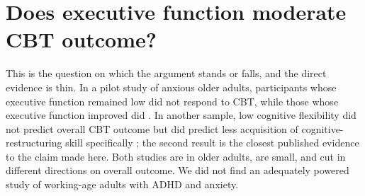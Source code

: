 \section{Does executive function moderate CBT outcome?}\label{sec:moderators}
This is the question on which the argument stands or falls, and the direct evidence is thin. In a pilot study of anxious older adults, participants whose executive function remained low did not respond to CBT, while those whose executive function improved did \citep{mohlman2005ef}. In another sample, low cognitive flexibility did not predict overall CBT outcome but did predict less acquisition of cognitive-restructuring skill specifically \citep{johnco2014flex}; the second result is the closest published evidence to the claim made here. Both studies are in older adults, are small, and cut in different directions on overall outcome. We did not find an adequately powered study of working-age adults with ADHD and anxiety.
